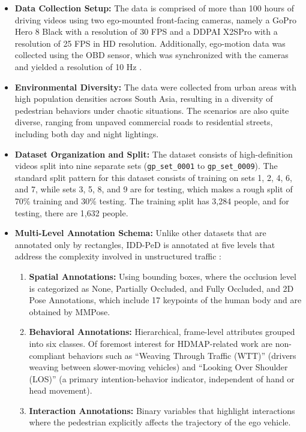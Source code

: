 \documentclass[12pt, a4paper]{article}
\begin{document}
\begin{itemize}
    \item \textbf{Data Collection Setup:} The data is comprised of more than 100 hours of driving videos using two ego-mounted front-facing cameras, namely a GoPro Hero 8 Black with a resolution of 30 FPS and a DDPAI X2SPro with a resolution of 25 FPS in HD resolution. Additionally, ego-motion data was collected using the OBD sensor, which was synchronized with the cameras and yielded a resolution of 10 Hz \cite{bokkasam2025pedestrian}.
    
    \item \textbf{Environmental Diversity:} The data were collected from urban areas with high population densities across South Asia, resulting in a diversity of pedestrian behaviors under chaotic situations. The scenarios are also quite diverse, ranging from unpaved commercial roads to residential streets, including both day and night lightings.
    
    \item \textbf{Dataset Organization and Split:} The dataset consists of high-definition videos split into nine separate sets (\texttt{gp\_set\_0001} to \texttt{gp\_set\_0009}). The standard split pattern for this dataset consists of training on sets 1, 2, 4, 6, and 7, while sets 3, 5, 8, and 9 are for testing, which makes a rough split of 70\% training and 30\% testing. The training split has 3,284 people, and for testing, there are 1,632 people.
    
    \item \textbf{Multi-Level Annotation Schema:} Unlike other datasets that are annotated only by rectangles, IDD-PeD is annotated at five levels that address the complexity involved in unstructured traffic \cite{bokkasam2025pedestrian}:
    \begin{enumerate}
        \item \textbf{Spatial Annotations:} Using bounding boxes, where the occlusion level is categorized as None, Partially Occluded, and Fully Occluded, and 2D Pose Annotations, which include 17 keypoints of the human body and are obtained by MMPose.
        \item \textbf{Behavioral Annotations:} Hierarchical, frame-level attributes grouped into six classes. Of foremost interest for HDMAP-related work are non-compliant behaviors such as ``Weaving Through Traffic (WTT)'' (drivers weaving between slower-moving vehicles) and ``Looking Over Shoulder (LOS)'' (a primary intention-behavior indicator, independent of hand or head movement).
        \item \textbf{Interaction Annotations:} Binary variables that highlight interactions where the pedestrian explicitly affects the trajectory of the ego vehicle.
        

\end{enumerate}
\end{itemize}
\end{document}
